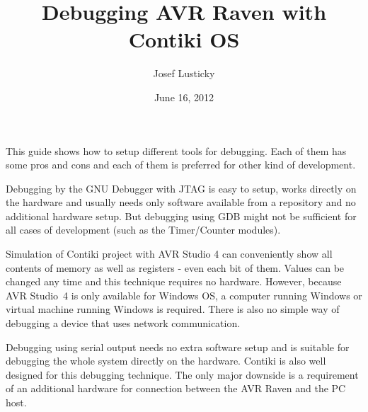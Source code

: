 \documentclass{article}
\begin{document}
\title{Debugging AVR Raven with Contiki OS}
\author{Josef Lusticky}
\date{June 16, 2012}

\maketitle

This guide shows how to setup different tools for debugging.
Each of them has some pros and cons and each of them is preferred for other kind of development.

Debugging by the GNU Debugger with JTAG is easy to setup, works directly on the hardware
and usually needs only software available from a repository and no additional hardware setup.
But debugging using GDB might not be sufficient for all cases of development (such as the Timer/Counter modules).

Simulation of Contiki project with AVR Studio 4 can conveniently show all contents of memory
as well as registers - even each bit of them.
Values can be changed any time and this technique requires no hardware.
However, because AVR Studio~4 is only available for Windows OS,
a computer running Windows or virtual machine running Windows is required.
There is also no simple way of debugging a device that uses network communication.

Debugging using serial output needs no extra software setup and is suitable
for debugging the whole system directly on the hardware.
Contiki is also well designed for this debugging technique.
The only major downside is a requirement of an additional hardware
for connection between the AVR Raven and the PC host.

\end{document}
